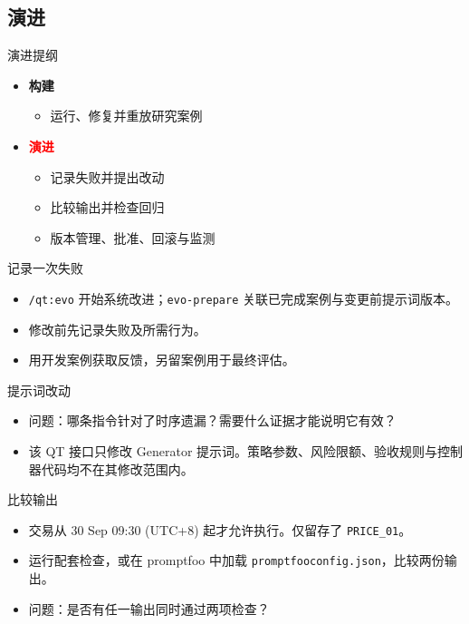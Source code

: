 \subsection{演进}

\begin{frame}{演进提纲}
\begin{itemize}
\item \textcolor{black!55}{\textbf{构建}}
\begin{itemize}
\item \textcolor{black!55}{运行、修复并重放研究案例}
\end{itemize}
\item \textcolor{red}{\textbf{演进}}
\begin{itemize}
\item 记录失败并提出改动
\item 比较输出并检查回归
\item 版本管理、批准、回滚与监测
\end{itemize}
\end{itemize}
\end{frame}

\begin{frame}{记录一次失败}

\medskip
\begin{itemize}
\item \texttt{/qt:evo} 开始系统改进；\texttt{evo-prepare} 关联已完成案例与变更前提示词版本。
\item 修改前先记录失败及所需行为。
\item 用开发案例获取反馈，另留案例用于最终评估。
\end{itemize}
\end{frame}

\begin{frame}{提示词改动\handsup}
\begin{center}

\end{center}
\begin{itemize}
\item 问题：哪条指令针对了时序遗漏？需要什么证据才能说明它有效？
\item 该 QT 接口只修改 Generator 提示词。策略参数、风险限额、验收规则与控制器代码均不在其修改范围内。
\end{itemize}
\end{frame}

\begin{frame}{比较输出\handsup}
\begin{center}
\small
\end{center}
\begin{itemize}
\item 交易从 30 Sep 09:30 (UTC+8) 起才允许执行。仅留存了 \texttt{PRICE\_01}。
\item 运行配套检查，或在 promptfoo 中加载 \texttt{promptfooconfig.json}，比较两份输出。
\item 问题：是否有任一输出同时通过两项检查？
\end{itemize}
\end{frame}

